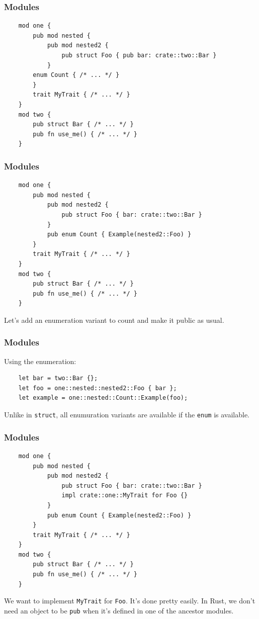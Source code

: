 \documentclass[aspectratio=1610,t]{beamer}
\begin{document}

\begin{frame}[fragile]
\frametitle{Modules}
\begin{verbatim}
    mod one {
        pub mod nested {
            pub mod nested2 {
                pub struct Foo { pub bar: crate::two::Bar }
            }
        enum Count { /* ... */ }
        }
        trait MyTrait { /* ... */ }
    }
    mod two {
        pub struct Bar { /* ... */ }
        pub fn use_me() { /* ... */ }
    }
\end{verbatim}
\end{frame}


\begin{frame}[fragile]
\frametitle{Modules}
\begin{verbatim}
    mod one {
        pub mod nested {
            pub mod nested2 {
                pub struct Foo { bar: crate::two::Bar }
            }
            pub enum Count { Example(nested2::Foo) }
        }
        trait MyTrait { /* ... */ }
    }
    mod two {
        pub struct Bar { /* ... */ }
        pub fn use_me() { /* ... */ }
    }
\end{verbatim}

Let's add an enumeration variant to count and make it public as usual.
\end{frame}


\begin{frame}[fragile]
\frametitle{Modules}
Using the enumeration:

\begin{verbatim}
    let bar = two::Bar {};
    let foo = one::nested::nested2::Foo { bar };
    let example = one::nested::Count::Example(foo);
\end{verbatim}

Unlike in \texttt{struct}, all enumuration variants are available if the \texttt{enum} is available.
\end{frame}


\begin{frame}[fragile]
\frametitle{Modules}
\begin{verbatim}
    mod one {
        pub mod nested {
            pub mod nested2 {
                pub struct Foo { bar: crate::two::Bar }
                impl crate::one::MyTrait for Foo {}
            }
            pub enum Count { Example(nested2::Foo) }
        }
        trait MyTrait { /* ... */ }
    }
    mod two {
        pub struct Bar { /* ... */ }
        pub fn use_me() { /* ... */ }
    }
\end{verbatim}

We want to implement \texttt{MyTrait} for \texttt{Foo}. It's done pretty easily. In Rust, we don't need an object to be \texttt{pub} when it's defined in one of the ancestor modules.
\end{frame}
\end{document}
